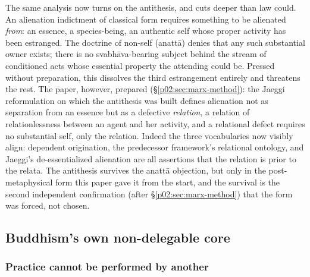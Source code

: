 \documentclass[11pt,a4paper]{article}
\begin{document}
The same analysis now turns on the antithesis, and cuts deeper than law could. An alienation indictment of classical form requires something to be alienated \emph{from}: an essence, a species-being, an authentic self whose proper activity has been estranged. The doctrine of non-self (anatt\=a) denies that any such substantial owner exists; there is no svabh\=ava-bearing subject behind the stream of conditioned acts whose essential property the attending could be. Pressed without preparation, this dissolves the third estrangement entirely and threatens the rest. The paper, however, prepared (\S\ref{p02:sec:marx-method}): the Jaeggi reformulation on which the antithesis was built defines alienation not as separation from an essence but as a defective \emph{relation}, a relation of relationlessness between an agent and her activity, and a relational defect requires no substantial self, only the relation. Indeed the three vocabularies now visibly align: dependent origination, the predecessor framework's relational ontology, and Jaeggi's de-essentialized alienation are all assertions that the relation is prior to the relata. The antithesis survives the anatt\=a objection, but only in the post-metaphysical form this paper gave it from the start, and the survival is the second independent confirmation (after \S\ref{p02:sec:marx-method}) that the form was forced, not chosen.

\subsection{Buddhism's own non-delegable core}
\label{p02:sec:buddhism-core}

\subsubsection{Practice cannot be performed by another}
\label{p02:sec:buddhism-practice}
\end{document}
